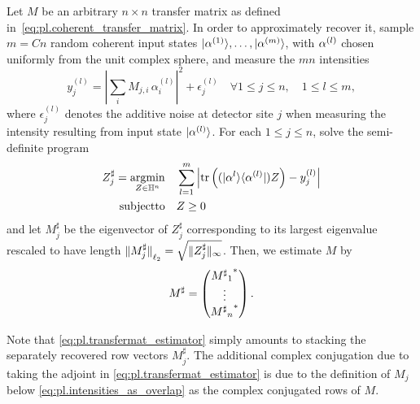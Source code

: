 \begin{protocol}%
  \label{prot:pl.detailed_reconstruction}
  Let ${M}$ be an arbitrary $n \times n$ transfer matrix as defined in~\eqref{eq:pl.coherent_transfer_matrix}.
  In order to approximately recover it, sample $m = Cn$ random coherent input states $\ket{{\alpha}^{(1)}},\ldots,\ket{{\alpha}^{(m)}}$, with $\alpha^{(l)}$ chosen uniformly from the unit complex sphere, and measure the $mn$ intensities
  \[
    y_j^{(l)} = \left| \sum_i M_{j,i} \, \alpha_i^{(l)} \right|^2 + \epsilon_j^{(l)} \quad \forall 1 \leq j \leq n, \quad 1 \leq l \leq m,
  \]
  where $\epsilon_j^{(l)}$ denotes the additive noise at detector site $j$ when measuring the intensity resulting from input state  $\ket{{\alpha}^{(l)}}$.
  For each $1 \leq j \leq n$, solve the semi-definite program
  \begin{align}
    {Z}^\sharp_{j} = \underset{{Z} \in \mathbb{H}^n}{\operatorname{argmin}}& \quad \sum_{l=1}^m \left| \operatorname{tr} \left( (|{\alpha}^{l} \rangle \langle {\alpha}^{(l)} | )  Z \right) - y_j^{(l)} \right| \label{eq:tmat_recovery_program}\\
    \mathrm{subject to} & \quad {Z} \geq 0 \nonumber
  \end{align}
  and let ${M}_j^\sharp$ be the eigenvector of ${Z}^\sharp_{j}$ corresponding to its largest eigenvalue rescaled to have length ${\Vert{M}_j^\sharp\Vert}_{\ell_2} = \sqrt{ \| {Z}^\sharp_{j} \|_\infty}$.
  Then, we estimate ${M}$ by
  \[
    {M}^\sharp =
    \begin{pmatrix}
      {{{M^\sharp}_1}^\ast} \\ \vdots \\  {{{M^\sharp}_n}^\ast}
    \end{pmatrix}.
    \label{eq:pl.transfermat_estimator}
  \]
\end{protocol}

Note that \cref{eq:pl.transfermat_estimator} simply amounts to stacking the separately recovered row vectors $ M_j^\sharp$.
The additional complex conjugation due to taking the adjoint in \cref{eq:pl.transfermat_estimator} is due to the definition of $M_j$ below \cref{eq:pl.intensities_as_overlap} as the complex conjugated rows of $M$.

